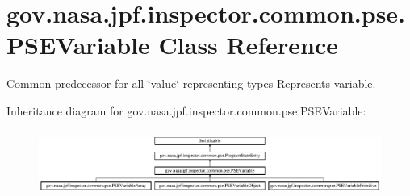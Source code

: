 \hypertarget{classgov_1_1nasa_1_1jpf_1_1inspector_1_1common_1_1pse_1_1_p_s_e_variable}{}\section{gov.\+nasa.\+jpf.\+inspector.\+common.\+pse.\+P\+S\+E\+Variable Class Reference}
\label{classgov_1_1nasa_1_1jpf_1_1inspector_1_1common_1_1pse_1_1_p_s_e_variable}


Common predecessor for all \char`\"{}value\char`\"{} representing types Represents variable.  


Inheritance diagram for gov.\+nasa.\+jpf.\+inspector.\+common.\+pse.\+P\+S\+E\+Variable\+:\begin{figure}[H]
\begin{center}
\leavevmode
\includegraphics[height=2.170543cm]{classgov_1_1nasa_1_1jpf_1_1inspector_1_1common_1_1pse_1_1_p_s_e_variable}
\end{center}
\end{figure}
